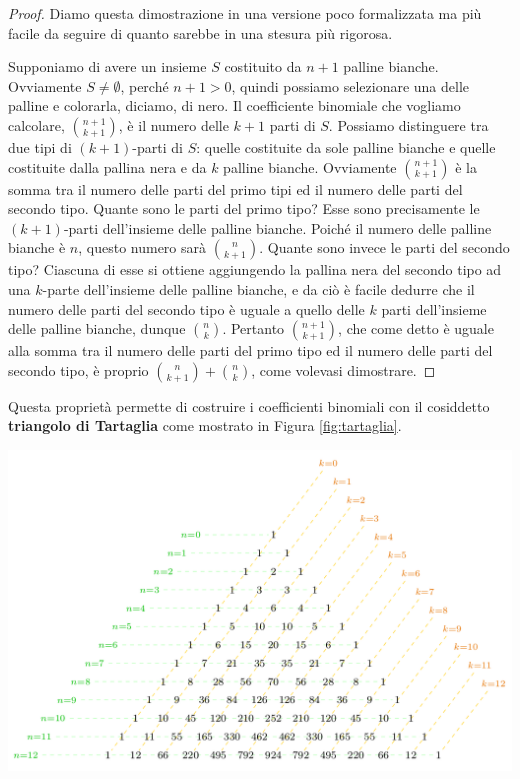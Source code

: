 \begin{proof}
	Diamo questa dimostrazione in una versione poco formalizzata ma più facile da seguire di quanto sarebbe in una stesura più rigorosa.
	
	Supponiamo di avere un insieme $S$ costituito da $n + 1$ palline bianche. Ovviamente $S \neq \emptyset$, perché $n+1>0$, quindi possiamo selezionare una delle palline e colorarla, diciamo, di nero. Il coefficiente binomiale che vogliamo calcolare, $\binom{n+1}{k+1}$, è il numero delle $k+1$ parti di $S$. Possiamo distinguere tra due tipi di $(k+1)$-parti di $S$: quelle costituite da sole palline bianche e quelle costituite dalla pallina nera e da $k$ palline bianche. Ovviamente $\binom{n+1}{k+1}$ è la somma tra il numero delle parti del primo tipi ed il numero delle parti del secondo tipo. Quante sono le parti del primo tipo? Esse sono precisamente le $(k+1)$-parti dell'insieme delle palline bianche. Poiché il numero delle palline bianche è $n$, questo numero sarà $\binom{n}{k+1}$. Quante sono invece le parti del secondo tipo? Ciascuna di esse si ottiene aggiungendo la pallina nera del secondo tipo ad una $k$-parte dell'insieme delle palline bianche, e da ciò è facile dedurre che il numero delle parti del secondo tipo è uguale a quello delle $k$ parti dell'insieme delle palline bianche, dunque $\binom{n}{k}$. Pertanto $\binom{n+1}{k+1}$, che come detto è uguale alla somma tra il numero delle parti del primo tipo ed il numero delle parti del secondo tipo, è proprio $\binom{n}{k+1} + \binom{n}{k}$, come volevasi dimostrare.
\end{proof}


	Questa proprietà permette di costruire i coefficienti binomiali con il cosiddetto \textbf{triangolo di Tartaglia} come mostrato in Figura \ref{fig:tartaglia}.



\begin{center}
	\includegraphics[scale=.5]{res/Tartaglia}
	\label{fig:tartaglia}
\end{center}

